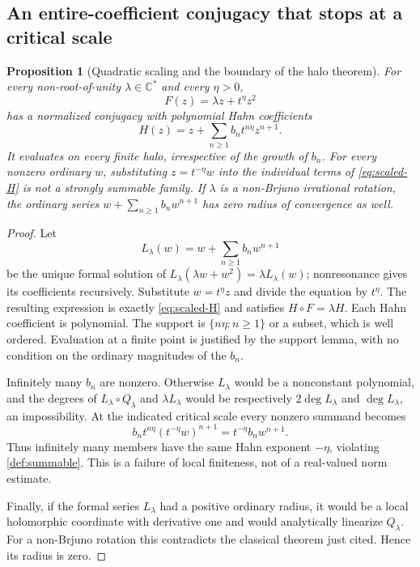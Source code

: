 \documentclass[11pt,letterpaper]{article}
\newtheorem{proposition}[proposition]{Proposition}
\theoremstyle{definition}
\theoremstyle{remark}
\newcommand{\C}{\mathbb C}
\numberwithin{equation}{section}
\begin{document}
\subsection{An entire-coefficient conjugacy that stops at a critical scale}
\begin{proposition}[Quadratic scaling and the boundary of the halo theorem]
\label{prop:quadratic-scale}
For every non-root-of-unity $\lambda\in\C^*$ and every $\eta>0$,
\begin{equation}\label{eq:scaled-quadratic}
 F(z)=\lambda z+t^\eta z^2
\end{equation}
has a normalized conjugacy with polynomial Hahn coefficients
\begin{equation}\label{eq:scaled-H}
 H(z)=z+\sum_{n\ge1}b_n t^{n\eta}z^{n+1}.
\end{equation}
It evaluates on every finite halo, irrespective of the growth of $b_n$.
For every nonzero ordinary $w$, substituting $z=t^{-\eta}w$ into the
individual terms of \eqref{eq:scaled-H} is \emph{not} a strongly summable
family. If $\lambda$ is a non-Brjuno irrational rotation, the ordinary series
$w+\sum_{n\ge1}b_nw^{n+1}$ has zero radius of convergence as well.
\end{proposition}
\begin{proof}
Let
\[
 L_\lambda(w)=w+\sum_{n\ge1}b_nw^{n+1}
\]
be the unique formal solution of
$L_\lambda(\lambda w+w^2)=\lambda L_\lambda(w)$; nonresonance gives its
coefficients recursively. Substitute $w=t^\eta z$ and divide the equation
by $t^\eta$. The resulting expression is exactly
\eqref{eq:scaled-H} and satisfies $H\circ F=\lambda H$. Each Hahn
coefficient is polynomial. The support is $\{n\eta:n\ge1\}$ or a subset,
which is well ordered. Evaluation at a finite point is justified by the
support lemma, with no condition on the ordinary magnitudes of the $b_n$.

Infinitely many $b_n$ are nonzero. Otherwise $L_\lambda$ would be a
nonconstant polynomial, and the degrees of
$L_\lambda\circ Q_\lambda$ and $\lambda L_\lambda$ would be respectively
$2\deg L_\lambda$ and $\deg L_\lambda$, an impossibility. At the indicated
critical scale every nonzero summand becomes
\[
 b_n t^{n\eta}(t^{-\eta}w)^{n+1}
      =t^{-\eta}b_nw^{n+1}.
\]
Thus infinitely many members have the same Hahn exponent $-\eta$, violating
\cref{def:summable}. This is a failure of local finiteness, not of a
real-valued norm estimate.

Finally, if the formal series $L_\lambda$ had a positive ordinary radius,
it would be a local holomorphic coordinate with derivative one and would
analytically linearize $Q_\lambda$. For a non-Brjuno rotation this contradicts
the classical theorem just cited. Hence its radius is zero.
\end{proof}
\end{document}
